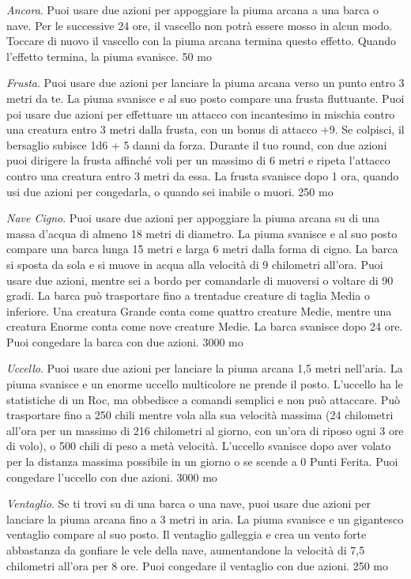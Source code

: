 \begin{multicols}{2}
	\textit{Ancora}. Puoi usare due azioni per appoggiare la piuma arcana a una barca o nave. Per le successive 24 ore, il vascello non potrà essere mosso in alcun modo. Toccare di nuovo il vascello con la piuma arcana termina questo effetto. Quando l'effetto termina, la piuma svanisce. 50 mo

	\textit{Frusta}. Puoi usare due azioni per lanciare la piuma arcana verso un punto entro 3 metri da te. La piuma svanisce e al suo posto compare una frusta fluttuante. Puoi poi usare due azioni per effettuare un attacco con incantesimo in mischia contro una creatura entro 3 metri dalla frusta, con un bonus di attacco +9. Se colpisci, il bersaglio subisce 1d6 + 5 danni da forza. Durante il tuo round, con due azioni puoi dirigere la frusta affinché voli per un massimo di 6 metri e ripeta l'attacco contro una creatura entro 3 metri da essa. La frusta svanisce dopo 1 ora, quando usi due azioni per congedarla, o quando sei inabile o muori. 250 mo

	\textit{Nave Cigno}. Puoi usare due azioni per appoggiare la piuma arcana su di una massa d'acqua di almeno 18 metri di diametro. La piuma svanisce e al suo posto compare una barca lunga 15 metri e larga 6 metri dalla forma di cigno. La barca si sposta da sola e si muove in acqua alla velocità di 9 chilometri all'ora. Puoi usare due azioni, mentre sei a bordo per comandarle di muoversi o voltare di 90 gradi. La barca può trasportare fino a trentadue creature di taglia Media o inferiore. Una creatura Grande conta come quattro creature Medie, mentre una creatura Enorme conta come nove creature Medie. La barca svanisce dopo 24 ore. Puoi congedare la barca con due azioni. 3000 mo

	\textit{Uccello}. Puoi usare due azioni per lanciare la piuma arcana 1,5 metri nell'aria. La piuma svanisce e un enorme uccello multicolore ne prende il posto. L'uccello ha le statistiche di un Roc, ma obbedisce a comandi semplici e non può attaccare. Può trasportare fino a 250 chili mentre vola alla sua velocità massima (24 chilometri all'ora per un massimo di 216 chilometri al giorno, con un'ora di riposo ogni 3 ore di volo), o 500 chili di peso a metà velocità. L'uccello svanisce dopo aver volato per la distanza massima possibile in un giorno o se scende a 0 Punti Ferita. Puoi congedare l'uccello con due azioni. 3000 mo

	\textit{Ventaglio}. Se ti trovi su di una barca o una nave, puoi usare due azioni per lanciare la piuma arcana fino a 3 metri in aria. La piuma svanisce e un gigantesco ventaglio compare al suo posto. Il ventaglio galleggia e crea un vento forte abbastanza da gonfiare le vele della nave, aumentandone la velocità di 7,5 chilometri all'ora per 8 ore. Puoi congedare il ventaglio con due azioni. 250 mo


\end{multicols}
